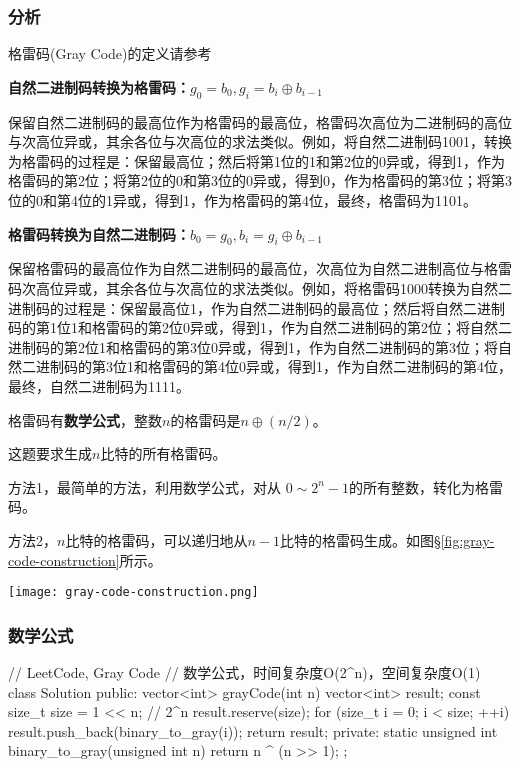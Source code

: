\subsubsection{分析}
格雷码(Gray Code)的定义请参考 

\textbf{自然二进制码转换为格雷码：$g_0=b_0, g_i=b_i \oplus b_{i-1}$}

保留自然二进制码的最高位作为格雷码的最高位，格雷码次高位为二进制码的高位与次高位异或，其余各位与次高位的求法类似。例如，将自然二进制码1001，转换为格雷码的过程是：保留最高位；然后将第1位的1和第2位的0异或，得到1，作为格雷码的第2位；将第2位的0和第3位的0异或，得到0，作为格雷码的第3位；将第3位的0和第4位的1异或，得到1，作为格雷码的第4位，最终，格雷码为1101。

\textbf{格雷码转换为自然二进制码：$b_0=g_0, b_i=g_i \oplus b_{i-1}$}

保留格雷码的最高位作为自然二进制码的最高位，次高位为自然二进制高位与格雷码次高位异或，其余各位与次高位的求法类似。例如，将格雷码1000转换为自然二进制码的过程是：保留最高位1，作为自然二进制码的最高位；然后将自然二进制码的第1位1和格雷码的第2位0异或，得到1，作为自然二进制码的第2位；将自然二进制码的第2位1和格雷码的第3位0异或，得到1，作为自然二进制码的第3位；将自然二进制码的第3位1和格雷码的第4位0异或，得到1，作为自然二进制码的第4位，最终，自然二进制码为1111。

格雷码有\textbf{数学公式}，整数$n$的格雷码是$n \oplus (n/2)$。

这题要求生成$n$比特的所有格雷码。

方法1，最简单的方法，利用数学公式，对从 $0\sim2^n-1$的所有整数，转化为格雷码。

方法2，$n$比特的格雷码，可以递归地从$n-1$比特的格雷码生成。如图\S \ref{fig:gray-code-construction}所示。

\begin{center}
\texttt{[image: gray-code-construction.png]}\\
\label{fig:gray-code-construction}
\end{center}


\subsubsection{数学公式}
\begin{Code}
// LeetCode, Gray Code
// 数学公式，时间复杂度O(2^n)，空间复杂度O(1)
class Solution {
public:
    vector<int> grayCode(int n) {
        vector<int> result;
        const size_t size = 1 << n;  // 2^n
        result.reserve(size);
        for (size_t i = 0; i < size; ++i)
            result.push_back(binary_to_gray(i));
        return result;
    }
private:
    static unsigned int binary_to_gray(unsigned int n) {
        return n ^ (n >> 1);
    }
};
\end{Code}


